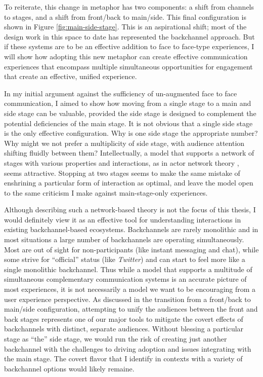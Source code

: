 To reiterate, this change in metaphor has two components: a shift from channels to stages, and a shift from front/back to main/side. This final configuration is shown in Figure \ref{fig:main-side-stage}. This is an aspirational shift; most of the design work in this space to date has represented the backchannel approach. But if these systems are to be an effective addition to face to face-type experiences, I will show how adopting this new metaphor can create effective communication experiences that encompass multiple simultaneous opportunities for engagement that create an effective, unified experience. 


In my initial argument against the sufficiency of un-augmented face to face communication, I aimed to show how moving from a single stage to a main and side stage can be valuable, provided the side stage is designed to complement the potential deficiencies of the main stage. It is not obvious that a single side stage is the only effective configuration. Why is one side stage the appropriate number? Why might we not prefer a multiplicity of side stage, with audience attention shifting fluidly between them? Intellectually, a model that supports a network of stages with various properties and interactions, as in actor network theory \citep{latour_reassembling_2007}, seems attractive. Stopping at two stages seems to make the same mistake of enshrining a particular form of interaction as optimal, and leave the model open to the same criticism I make against main-stage-only experiences.

Although describing such a network-based theory is not the focus of this thesis, I would definitely view it as an effective tool for understanding interactions in existing backchannel-based ecosystems. Backchannels are rarely monolithic and in most situations a large number of backchannels are operating simultaneously. Most are out of sight for non-participants (like instant messaging and chat), while some strive for ``official'' status (like \emph{Twitter}) and can start to feel more like a single monolithic backchannel. Thus while a model that supports a multitude of simultaneous complementary communication systems is an accurate picture of most experiences, it is not necessarily a model we want to be encouraging from a user experience perspective. As discussed in the transition from a front/back to main/side configuration, attempting to unify the audiences between the front and back stages represents one of our major tools to mitigate the covert effects of backchannels with distinct, separate audiences. Without blessing a particular stage as ``the'' side stage, we would run the risk of creating just another backchannel with the challenges to driving adoption and issues integrating with the main stage. The covert flavor that I identify in contexts with a variety of backchannel options would likely remaine.

